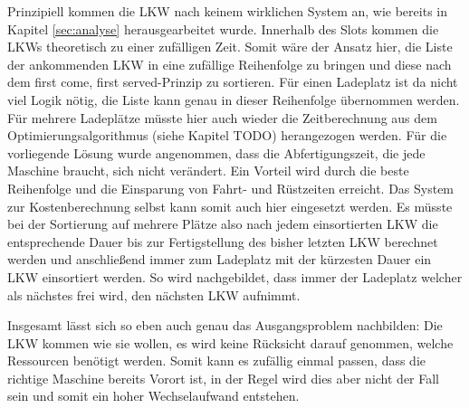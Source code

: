 Prinzipiell kommen die LKW nach keinem wirklichen System an, wie bereits in Kapitel \ref{sec:analyse} herausgearbeitet wurde. Innerhalb des Slots kommen die LKWs theoretisch zu einer zufälligen Zeit. Somit wäre der Ansatz hier, die Liste der ankommenden LKW in eine zufällige Reihenfolge zu bringen und diese nach dem \glqq{}first come, first served\grqq{}-Prinzip zu sortieren. Für einen Ladeplatz ist da nicht viel Logik nötig, die Liste kann genau in dieser Reihenfolge übernommen werden. Für mehrere Ladeplätze müsste hier auch wieder die Zeitberechnung aus dem Optimierungsalgorithmus (siehe Kapitel TODO) herangezogen werden. Für die vorliegende Lösung wurde angenommen, dass die Abfertigungszeit, die jede Maschine braucht, sich nicht verändert. Ein Vorteil wird durch die beste Reihenfolge und die Einsparung von Fahrt- und Rüstzeiten erreicht. Das System zur Kostenberechnung selbst kann somit auch hier eingesetzt werden. Es müsste bei der Sortierung auf mehrere Plätze also nach jedem einsortierten LKW die entsprechende Dauer bis zur Fertigstellung des bisher letzten LKW berechnet werden und anschließend immer zum Ladeplatz mit der kürzesten Dauer ein LKW einsortiert werden. So wird nachgebildet, dass immer der Ladeplatz welcher als nächstes frei wird, den nächsten LKW aufnimmt.

Insgesamt lässt sich so eben auch genau das Ausgangsproblem nachbilden: Die LKW kommen wie sie wollen, es wird keine Rücksicht darauf genommen, welche Ressourcen benötigt werden. Somit kann es zufällig einmal passen, dass die richtige Maschine bereits Vorort ist, in der Regel wird dies aber nicht der Fall sein und somit ein hoher Wechselaufwand entstehen.
